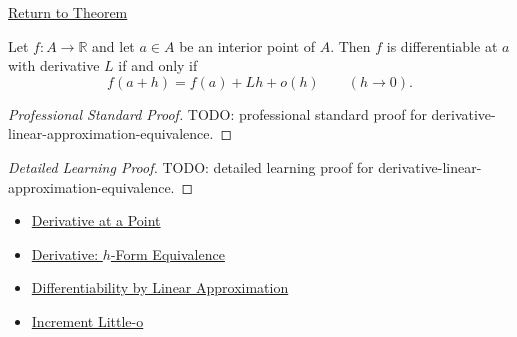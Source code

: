 \newpage
{}
\label{prf:derivative-linear-approximation-equivalence}

\begin{remark*}[Return]
\hyperref[thm:derivative-linear-approximation-equivalence]{Return to Theorem}
\end{remark*}

\begin{theorem*}
Let $f:A\to\mathbb{R}$ and let $a\in A$ be an interior point of $A$. Then
$f$ is differentiable at $a$ with derivative $L$ if and only if
\[
  f(a+h)=f(a)+Lh+o(h)
  \qquad (h\to 0).
\]
\end{theorem*}

\begin{proof}[Professional Standard Proof]
\LRAProofBodyStart
TODO: professional standard proof for derivative-linear-approximation-equivalence.
\end{proof}

\begin{proof}[Detailed Learning Proof]
\LRAProofBodyStart
TODO: detailed learning proof for derivative-linear-approximation-equivalence.
\end{proof}

\begin{remark*}
\end{remark*}

\begin{dependencies}
\begin{itemize}
  \item \hyperref[def:derivative-at-a-point]{Derivative at a Point}
  \item \hyperref[prop:derivative-h-form-equivalence]{Derivative: $h$-Form Equivalence}
  \item \hyperref[def:differentiability-linear-approximation]{Differentiability by Linear Approximation}
  \item \hyperref[def:increment-little-o]{Increment Little-o}
\end{itemize}
\end{dependencies}

\clearpage
